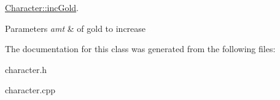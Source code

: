\hyperlink{class_character_a022b611a56f1c4a87972de352b9c58ed}{Character\-::inc\-Gold}. 


\begin{DoxyParams}{Parameters}
{\em amt} & of gold to increase \\
\hline
\end{DoxyParams}


The documentation for this class was generated from the following files\-:\begin{DoxyCompactItemize}
\item 
character.\-h\item 
character.\-cpp\end{DoxyCompactItemize}
